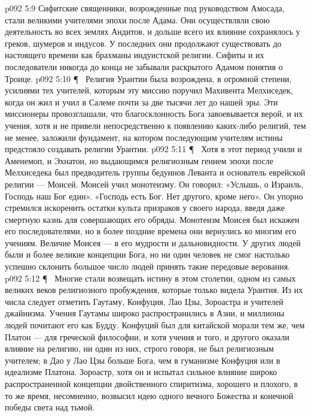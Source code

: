 \vs p092 5:9 \bibnobreakspace {} Сифитские священники, возрожденные под руководством Амосада, стали великими учителями эпохи после Адама. Они осуществляли свою деятельность во всех землях Андитов, и дольше всего их влияние сохранялось у греков, шумеров и индусов. У последних они продолжают существовать до настоящего времени как брахманы индуистской религии. Сифиты и их последователи никогда до конца не забывали раскрытого Адамом понятия о Троице.
\vs p092 5:10 \P\ \bibnobreakspace {} Религия Урантии была возрождена, в огромной степени, усилиями тех учителей, которым эту миссию поручил Махивента Мелхиседек, когда он жил и учил в Салеме почти за две тысячи лет до нашей эры. Эти миссионеры провозглашали, что благосклонность Бога завоевывается верой, и их учения, хотя и не привели непосредственно к появлению каких\hyp{}либо религий, тем не менее, заложили фундамент, на котором последующим учителям истины предстояло создавать религии Урантии.
\vs p092 5:11 \P\ \bibnobreakspace {} Хотя в этот период учили и Аменемоп, и Эхнатон, но выдающимся религиозным гением эпохи после Мелхиседека был предводитель группы бедуинов Леванта и основатель еврейской религии --- Моисей. Моисей учил монотеизму. Он говорил: «Услышь, о Израиль, Господь наш Бог един». «Господь есть Бог. Нет другого, кроме него». Он упорно стремился искоренить остатки культа призраков у своего народа, введя даже смертную казнь для совершающих его обряды. Монотеизм Моисея был искажен его последователями, но в более поздние времена они вернулись ко многим его учениям. Величие Моисея --- в его мудрости и дальновидности. У других людей были и более великие концепции Бога, но ни один человек не смог настолько успешно склонить большое число людей принять такие передовые верования.
\vs p092 5:12 \P\ \bibnobreakspace {} Многие стали возвещать истину в этом столетии, одном из самых великих веков религиозного пробуждения, которые только видела Урантия. Из их числа следует отметить Гаутаму, Конфуция, Лао Цзы, Зороастра и учителей джайнизма. Учения Гаутамы широко распространились в Азии, и миллионы людей почитают его как Будду. Конфуций был для китайской морали тем же, чем Платон --- для греческой философии, и хотя учения и того, и другого оказали влияние на религию, ни один из них, строго говоря, не был религиозным учителем; в Дао у Лао Цзы больше Бога, чем в гуманизме Конфуция или в идеализме Платона. Зороастр, хотя он и испытал сильное влияние широко распространенной концепции двойственного спиритизма, хорошего и плохого, в то же время, несомненно, возвысил идею одного вечного Божества и конечной победы света над тьмой.

